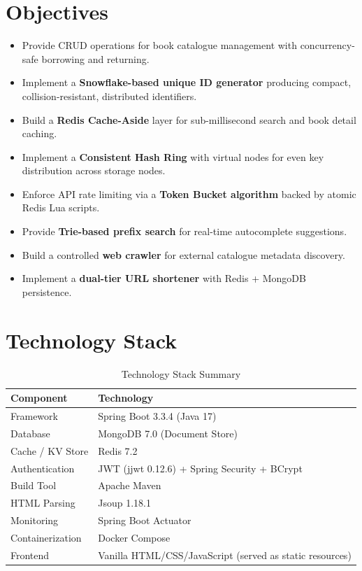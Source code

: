 \documentclass[12pt,a4paper]{report}
\begin{document}
\section{Objectives}
\begin{itemize}[noitemsep]
    \item Provide CRUD operations for book catalogue management with concurrency-safe borrowing and returning.
    \item Implement a \textbf{Snowflake-based unique ID generator} producing compact, collision-resistant, distributed identifiers.
    \item Build a \textbf{Redis Cache-Aside} layer for sub-millisecond search and book detail caching.
    \item Implement a \textbf{Consistent Hash Ring} with virtual nodes for even key distribution across storage nodes.
    \item Enforce API rate limiting via a \textbf{Token Bucket algorithm} backed by atomic Redis Lua scripts.
    \item Provide \textbf{Trie-based prefix search} for real-time autocomplete suggestions.
    \item Build a controlled \textbf{web crawler} for external catalogue metadata discovery.
    \item Implement a \textbf{dual-tier URL shortener} with Redis + MongoDB persistence.
\end{itemize}

\section{Technology Stack}

\begin{table}[H]
\centering
\caption{Technology Stack Summary}
\begin{tabularx}{\textwidth}{l X}
\toprule
\textbf{Component} & \textbf{Technology} \\
\midrule
Framework & Spring Boot 3.3.4 (Java 17) \\
Database & MongoDB 7.0 (Document Store) \\
Cache / KV Store & Redis 7.2 \\
Authentication & JWT (jjwt 0.12.6) + Spring Security + BCrypt \\
Build Tool & Apache Maven \\
HTML Parsing & Jsoup 1.18.1 \\
Monitoring & Spring Boot Actuator \\
Containerization & Docker Compose \\
Frontend & Vanilla HTML/CSS/JavaScript (served as static resources) \\
\bottomrule
\end{tabularx}
\end{table}
\end{document}
